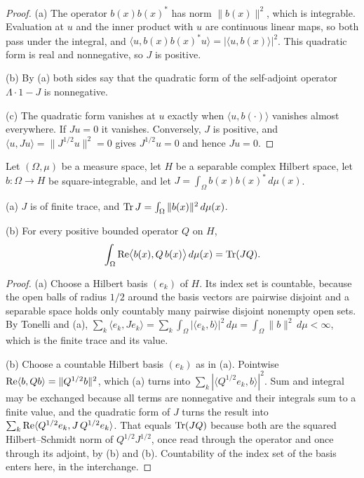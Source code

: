 \begin{proof}
\leanok
(a) The operator $b(x) b(x)^*$ has norm $\|b(x)\|^2$, which is integrable. Evaluation at
$u$ and the inner product with $u$ are continuous linear maps, so both pass under the
integral, and $\langle u, b(x) b(x)^* u \rangle = |\langle u, b(x) \rangle|^2$. This
quadratic form is real and nonnegative, so $J$ is positive.

(b) By (a) both sides say that the quadratic form of the self-adjoint operator
$\Lambda \cdot 1 - J$ is nonnegative.

(c) The quadratic form vanishes at $u$ exactly when $\langle u, b(\cdot) \rangle$ vanishes
almost everywhere. If $J u = 0$ it vanishes. Conversely, $J$ is positive, and
$\langle u, J u \rangle = \|J^{1/2} u\|^2 = 0$ gives $J^{1/2} u = 0$ and hence $J u = 0$.
\end{proof}

\begin{lemma}
\label{lem:gram-operator-trace}
\leanok
{}
Let $(\Omega, \mu)$ be a measure space, let $H$ be a separable complex Hilbert space, let
$b : \Omega \to H$ be square-integrable, and let $J = \int_\Omega b(x) b(x)^* \, d\mu(x)$.

(a) $J$ is of finite trace, and $\operatorname{Tr} J = \int_\Omega \|b(x)\|^2 \, d\mu(x)$.

(b) For every positive bounded operator $Q$ on $H$,
\[
  \int_\Omega \operatorname{Re} \bigl\langle b(x), Q \, b(x) \bigr\rangle \, d\mu(x) = \operatorname{Tr} (J Q).
\]
\end{lemma}

\begin{proof}
\leanok
{}
(a) Choose a Hilbert basis $(e_k)$ of $H$. Its index set is countable, because the open
balls of radius $1/2$ around the basis vectors are pairwise disjoint and a separable space
holds only countably many pairwise disjoint nonempty open sets. By Tonelli and
(a),
$\sum_k \langle e_k, J e_k \rangle = \sum_k \int_\Omega |\langle e_k, b \rangle|^2 \, d\mu
= \int_\Omega \|b\|^2 \, d\mu < \infty$, which is the finite trace and its value.

(b) Choose a countable Hilbert basis $(e_k)$ as in (a). Pointwise
$\operatorname{Re} \langle b, Q b \rangle = \|Q^{1/2} b\|^2$, which
(a) turns into
$\sum_k |\langle Q^{1/2} e_k, b \rangle|^2$. Sum and integral may be exchanged because all
terms are nonnegative and their integrals sum to a finite value, and the quadratic form
of $J$ turns the result into $\sum_k \operatorname{Re} \langle Q^{1/2} e_k, J \, Q^{1/2} e_k \rangle$. That
equals $\operatorname{Tr} (J Q)$ because both are the squared Hilbert--Schmidt norm of
$Q^{1/2} J^{1/2}$, once read through the operator and once through its adjoint, by
(b) and (b). Countability of
the index set of the basis enters here, in the interchange.
\end{proof}

